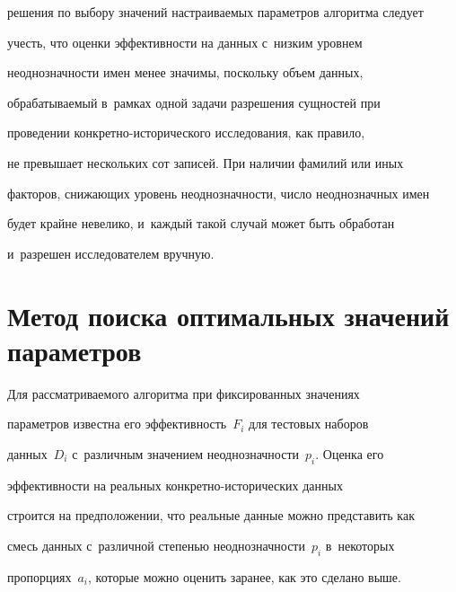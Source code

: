 решения по выбору значений на\-стра\-и\-ва\-емых па\-ра\-мет\-ров алгоритма следует 


учесть, что оценки эф\-фек\-тив\-ности на данных с~низким уровнем 


не\-од\-но\-знач\-ности имен менее значимы, поскольку объем данных, 


обрабатываемый в~рамках одной задачи разрешения сущностей при 


проведении кон\-крет\-но-ис\-то\-ри\-че\-ско\-го исследования, как правило, 


не превышает нескольких сот записей. При наличии фамилий или иных 


факторов, сни\-жа\-ющих уровень не\-од\-но\-знач\-ности, чис\-ло не\-од\-но\-знач\-ных имен 


будет крайне невелико, и~каждый такой случай может быть обработан 


и~разрешен исследователем вруч\-ную.





\vspace*{-2pt}





\section{Метод поиска оптимальных значений параметров}





\vspace*{-2pt}


  


  Для рассматриваемого алгоритма при фиксированных значениях 


па\-ра\-мет\-ров известна его эф\-фек\-тив\-ность~$F_i$ для тестовых наборов 


данных~$D_i$ с~различным значением не\-од\-но\-знач\-ности~$p_i$. Оценка его 


эф\-фек\-тив\-ности на реальных кон\-крет\-но-ис\-то\-ри\-че\-ских данных 


строится на предположении, что реальные данные мож\-но пред\-ста\-вить как 


смесь данных с~различной сте\-пенью не\-од\-но\-знач\-ности~$p_i$ в~некоторых 


пропорциях~$a_i$, которые мож\-но оценить заранее, как это сделано выше. 


